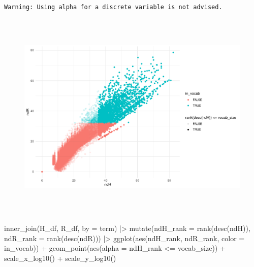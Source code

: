 \documentclass[
]{article}
\newenvironment{Shaded}{\begin{snugshade}}{\end{snugshade}}
\newcommand{\AttributeTok}[1]{\textcolor[rgb]{0.40,0.45,0.13}{#1}}
\newcommand{\FunctionTok}[1]{\textcolor[rgb]{0.28,0.35,0.67}{#1}}
\newcommand{\NormalTok}[1]{\textcolor[rgb]{0.00,0.23,0.31}{#1}}
\newcommand{\SpecialCharTok}[1]{\textcolor[rgb]{0.37,0.37,0.37}{#1}}
\newcommand{\StringTok}[1]{\textcolor[rgb]{0.13,0.47,0.30}{#1}}
\begin{document}
\begin{verbatim}
Warning: Using alpha for a discrete variable is not advised.
\end{verbatim}

\begin{figure}[H]

{\centering \includegraphics[width=6in,height=4in]{paper_files/figure-pdf/unnamed-chunk-44-1.pdf}

}

\end{figure}

\begin{Shaded}
\begin{Highlighting}[]
\FunctionTok{inner\_join}\NormalTok{(H\_df, R\_df, }\AttributeTok{by =} \StringTok{\textquotesingle{}term\textquotesingle{}}\NormalTok{) }\SpecialCharTok{|\textgreater{}} 
    \FunctionTok{mutate}\NormalTok{(}\AttributeTok{ndH\_rank =} \FunctionTok{rank}\NormalTok{(}\FunctionTok{desc}\NormalTok{(ndH)), }
           \AttributeTok{ndR\_rank =} \FunctionTok{rank}\NormalTok{(}\FunctionTok{desc}\NormalTok{(ndR))) }\SpecialCharTok{|\textgreater{}} 
    \FunctionTok{ggplot}\NormalTok{(}\FunctionTok{aes}\NormalTok{(ndH\_rank, ndR\_rank, }\AttributeTok{color =}\NormalTok{ in\_vocab)) }\SpecialCharTok{+}
    \FunctionTok{geom\_point}\NormalTok{(}\FunctionTok{aes}\NormalTok{(}\AttributeTok{alpha =}\NormalTok{ ndH\_rank }\SpecialCharTok{\textless{}=}\NormalTok{ vocab\_size)) }\SpecialCharTok{+}
    \FunctionTok{scale\_x\_log10}\NormalTok{() }\SpecialCharTok{+} 
    \FunctionTok{scale\_y\_log10}\NormalTok{()}
\end{Highlighting}
\end{Shaded}
\end{document}
